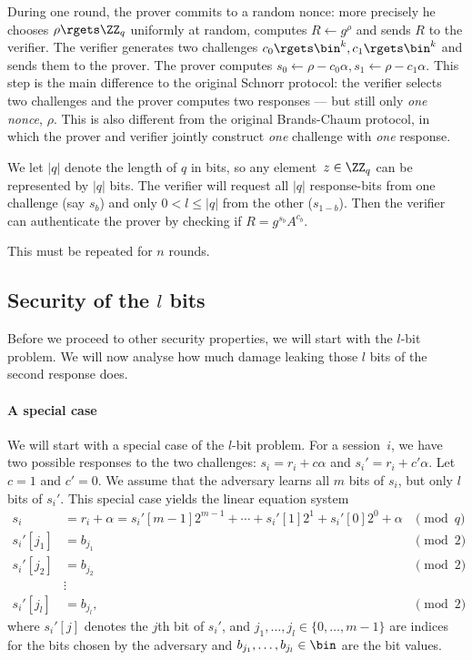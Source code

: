 During one round, the prover commits to a random nonce: more precisely he 
chooses \(
  \rho\rgets \ZZ_q
\) uniformly at random, computes \(
  R\gets g^\rho
\) and sends \(R\) to the verifier.
The verifier generates two challenges \(
  c_0\rgets \bin^k,
  c_1\rgets \bin^k
\) and sends them to the prover.
The prover computes \(
  s_0\gets \rho - c_0\alpha,
  s_1\gets \rho - c_1\alpha.
\)
This step is the main difference to the original Schnorr protocol: the verifier selects two challenges and the prover computes two responses --- but still only \emph{one nonce}, \(\rho\).
This is also different from the original Brands-Chaum protocol, in which the 
prover and verifier jointly construct \emph{one} challenge with \emph{one} 
response.

We let \(|q|\) denote the length of \(q\) in bits, so any element~\(z\in 
\ZZ_q\) can be represented by \(|q|\) bits.
The verifier will request all \(|q|\) response-bits from one challenge (say 
\(s_b\)) and only \(0 < l\leq |q|\) from the other (\(s_{1-b}\)).
Then the verifier can authenticate the prover by checking if \(
  R = g^{s_b}A^{c_b}.
\)

This must be repeated for \(n\) rounds.


\subsection{Security of the \(l\) bits}

Before we proceed to other security properties, we will start with the 
\(l\)-bit problem.
We will now analyse how much damage leaking those \(l\) bits of the second 
response does.

\paragraph*{A special case}

We will start with a special case of the \(l\)-bit problem.
For a session~\(i\), we have two possible responses to the two challenges:
\(s_i = r_i + c\alpha\) and \(s_i' = r_i + c'\alpha\).
Let \(c = 1\) and \(c' = 0\).
We assume that the adversary learns all \(m\) bits of \(s_i\), but only \(l\) 
bits of \(s_i'\).
This special case yields the linear equation system
\begin{align*}
  s_i &= r_i + \alpha
  = s_i'[m-1] 2^{m-1} + \dotsb + s_i'[1] 2^1 + s_i'[0] 2^0 + \alpha &\pmod q\\
  s_i'[j_1] &= b_{j_1} &\pmod 2\\
  s_i'[j_2] &= b_{j_2} &\pmod 2\\
            &\vdots \\
  s_i'[j_l] &= b_{j_l}, &\pmod 2
\end{align*}
where \(s_i'[j]\) denotes the \(j\)th bit of \(s_i'\), and \(j_1, \dotsc, 
j_l\in \{0, \dotsc, m-1\}\) are indices for the bits chosen by the adversary 
and \(b_{j_1}, \dotsc, b_{j_l}\in \bin\) are the bit values.

